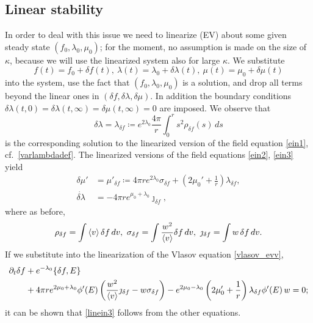\documentclass[11pt]{article}
\begin{document}
\subsection{Linear stability}
\label{linstab_ev}
%
%
In order to deal with this issue we need to linearize (EV) about
some given steady state
$(f_0,\lambda_0,\mu_0)$; for the moment, no assumption is made on
the size of $\kappa$, because we will use the linearized system
also for large $\kappa$. We substitute 
\[
f(t)=f_0 +\delta f(t),\ 
\lambda(t)=\lambda_0 + \delta\lambda(t),\ 
\mu(t)=\mu_0 + \delta\mu(t)
\]
into the system, use the fact that $(f_0,\lambda_0,\mu_0)$
is a solution, and drop all terms beyond the linear ones in
$(\delta f,\delta\lambda,\delta\mu)$. In addition the boundary conditions
$\delta\lambda(t,0)=\delta\lambda(t,\infty) =\delta\mu(t,\infty)=0$
are imposed.
We observe that
\begin{equation}\label{linein1}
  \delta\lambda = \lambda_{\delta f} \coloneqq 
  e^{2 \lambda_0}\frac{4 \pi}{r} \int_0^r s^2 \rho_{\delta f} (s)\,ds
\end{equation}
is the corresponding solution to the linearized version of the
field equation \eqref{ein1},
cf.~\eqref{varlambdadef}. The linearized versions of the
field equations \eqref{ein2}, \eqref{ein3} yield
\begin{align}
  \delta\mu'
  &= \mu'_{\delta f} \coloneqq
  4\pi r e^{2\lambda_0} \sigma_{\delta f}
  + \left(2\mu_0'+\frac{1}{r}\right) \lambda_{\delta f}, \label{linein2}\\
  \dot{\delta\lambda}
  &=
  -4\pi r e^{\mu_0+\lambda_0}\jmath_{\delta f},\label{linein3}
\end{align}
where as before,
\[ 
\rho_{\delta f} = \int \left\langle v\right\rangle \delta f\, dv,\
\sigma_{\delta f} = \int \frac{w^2}{\left\langle v\right\rangle} \delta f\, dv,\
\jmath_{\delta f} = \int w\, \delta f\, dv.
\]
If we substitute into the linearization of the Vlasov equation
\eqref{vlasov_evv},
\begin{align}\label{linvlasov}
  \partial_t\delta f
  &+
  e^{-\lambda_0}\{\delta f,E\} \notag \\
  &{}+
  4\pi r e^{2\mu_0+\lambda_0} \phi'(E)
  \left(\frac{w^2}{\left\langle v\right\rangle} \jmath_{\delta f} - w \sigma_{\delta f}\right)
  - e^{2\mu_0-\lambda_0} \left(2\mu_0'+\frac{1}{r}\right)
  \lambda_{\delta f}\phi'(E)\, w =0;
\end{align}
it can be shown that \eqref{linein3} follows from the other equations.
\end{document}
